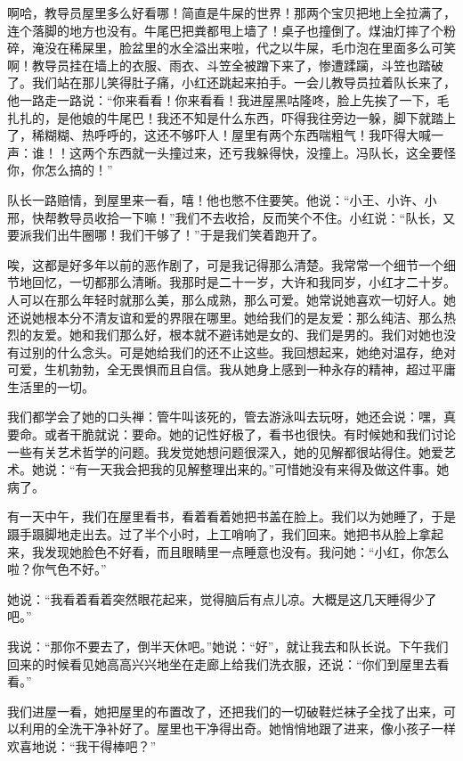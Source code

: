 啊哈，教导员屋里多么好看哪！简直是牛屎的世界！那两个宝贝把地上全拉满了，连个落脚的地方也没有。牛尾巴把粪都甩上墙了！桌子也撞倒了。煤油灯摔了个粉碎，淹没在稀屎里，脸盆里的水全溢出来啦，代之以牛屎，毛巾泡在里面多么可笑啊！教导员挂在墙上的衣服、雨衣、斗笠全被蹭下来了，惨遭蹂躏，斗笠也踏破了。我们站在那儿笑得肚子痛，小红还跳起来拍手。一会儿教导员拉着队长来了，他一路走一路说：“你来看看！你来看看！我进屋黑咕隆咚，脸上先挨了一下，毛扎扎的，是他娘的牛尾巴！我还不知是什么东西，吓得我往旁边一躲，脚下就踏上了，稀糊糊、热呼呼的，这还不够吓人！屋里有两个东西喘粗气！我吓得大喊一声：谁！！这两个东西就一头撞过来，还亏我躲得快，没撞上。冯队长，这全要怪你，你怎么搞的！” 

队长一路赔情，到屋里来一看，嘻！他也憋不住要笑。他说：“小王、小许、小邢，快帮教导员收拾一下嘛！”我们不去收拾，反而笑个不住。小红说：“队长，又要派我们出牛圈哪！我们干够了！”于是我们笑着跑开了。 

唉，这都是好多年以前的恶作剧了，可是我记得那么清楚。我常常一个细节一个细节地回忆，一切都那么清晰。我那时是二十一岁，大许和我同岁，小红才二十岁。人可以在那么年轻时就那么美，那么成熟，那么可爱。她常说她喜欢一切好人。她还说她根本分不清友谊和爱的界限在哪里。她给我们的是友爱：那么纯洁、那么热烈的友爱。她和我们那么好，根本就不避讳她是女的、我们是男的。我们对她也没有过别的什么念头。可是她给我们的还不止这些。我回想起来，她绝对温存，绝对可爱，生机勃勃，全无畏惧而且自信。我从她身上感到一种永存的精神，超过平庸生活里的一切。 

我们都学会了她的口头禅：管牛叫该死的，管去游泳叫去玩呀，她还会说：嘿，真要命。或者干脆就说：要命。她的记性好极了，看书也很快。有时候她和我们讨论一些有关艺术哲学的问题。我发觉她想问题很深入，她的见解都很站得住。她爱艺术。她说：“有一天我会把我的见解整理出来的。”可惜她没有来得及做这件事。她病了。 

有一天中午，我们在屋里看书，看着看着她把书盖在脸上。我们以为她睡了，于是蹑手蹑脚地走出去。过了半个小时，上工哨响了，我们回来。她把书从脸上拿起来，我发现她脸色不好看，而且眼睛里一点睡意也没有。我问她：“小红，你怎么啦？你气色不好。” 

她说：“我看着看着突然眼花起来，觉得脑后有点儿凉。大概是这几天睡得少了吧。” 

我说：“那你不要去了，倒半天休吧。”她说：“好”，就让我去和队长说。下午我们回来的时候看见她高高兴兴地坐在走廊上给我们洗衣服，还说：“你们到屋里去看看。” 

我们进屋一看，她把屋里的布置改了，还把我们的一切破鞋烂袜子全找了出来，可以利用的全洗干净补好了。屋里也干净得出奇。她悄悄地跟了进来，像小孩子一样欢喜地说：“我干得棒吧？” 

